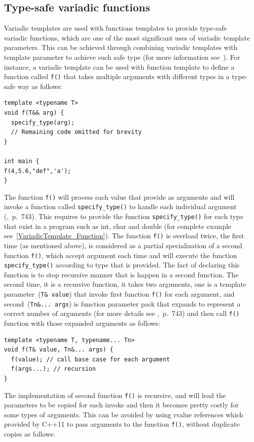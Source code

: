 \documentclass[11pt]{report}
\begin{document}
\subsection{Type-safe variadic functions}
Variadic templates are used with functions templates to provide type-safe variadic functions, which are one of the most significant uses of variadic template parameters. This can be achieved through combining variadic templates with template parameter to achieve such safe type (for more information see~\cite{Gregor:2007:VTC}). For instance, a variadic template can be used with function template to define a function called \texttt{f()} that takes multiple arguments with different types in a type-safe way as follows:
\begin{lstlisting}
template <typename T>
void f(T&& arg) {
  specify_type(arg);
  // Remaining code omitted for brevity
}

int main {
f(4,5.6,"def",'a');
}
\end{lstlisting}
The function \texttt{f()} will process each value that provide as arguments and will invoke a function called \texttt{specify\_type()} to handle each individual argument (\cite{Gregorie:professionalcpp},~p.~743). This requires to provide the function \texttt{specify\_type()} for each type that exist in a program such as int, char and double (for complete example see~\ref{VariadicTemplate_Function}). The function \texttt{f()} is overload twice, the first time (as mentioned above), is considered as a partial specialization of a second function \texttt{f()}, which accept argument each time and will execute the function \texttt{specify\_type()} according to type that is provided. The fact of declaring this function is to stop recursive manner that is happen in a second function. The second time, it is a recursive function, it takes two arguments, one is a template parameter~(\texttt{T\&~value}) that invoke first function \texttt{f()} for each argument, and second~(\texttt{Tn\&...~args}) is function parameter pack that expands to represent a correct number of arguments (for more details see \cite{Gregorie:professionalcpp},~p.~743) and then call \texttt{f()} function with those expanded arguments as follows:
\begin{lstlisting}
template <typename T, typename... Tn>
void f(T& value, Tn&... args) {
  f(value); // call base case for each argument
  f(args...); // recursion
}
\end{lstlisting}
The implementation of second function \texttt{f()} is recursive, and will lead the parameters to be copied for each invoke and then it becomes pretty costly for some types of arguments. This can be avoided by using rvalue references which provided by C++11 to pass arguments to the function \texttt{f()}, without duplicate copies as follows:
\end{document}
